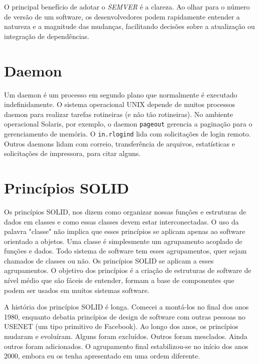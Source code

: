\documentclass[12pt, %
openright, 
oneside, %
a4paper,    %
brazil]{facom-ufu-abntex2}
\begin{document}
O principal benefício de adotar o \textit{SEMVER} é a clareza. Ao olhar para o
número de versão de um software, os desenvolvedores podem rapidamente entender
a natureza e a magnitude das mudanças, facilitando decisões sobre a atualização
ou integração de dependências. \cite{semver}

\section{Daemon}

Um daemon é um processo em segundo plano que normalmente é executado
indefinidamente. O sistema operacional UNIX depende de muitos processos daemon
para realizar tarefas rotineiras (e não tão rotineiras). No ambiente
operacional Solaris, por exemplo, o daemon \texttt{pageout} gerencia a
paginação para o gerenciamento de memória. O \texttt{in.rlogind} lida com
solicitações de login remoto. Outros daemons lidam com correio, transferência
de arquivos, estatísticas e solicitações de impressora, para citar alguns.
\cite{kay2004unix}

\section{Princípios SOLID}

Os princípios SOLID, nos dizem como organizar nossas funções e estruturas de
dados em classes e como essas classes devem estar interconectadas. O uso da
palavra "classe" não implica que esses princípios se aplicam apenas ao software
orientado a objetos. Uma classe é simplesmente um agrupamento acoplado de
funções e dados. Todo sistema de software tem esses agrupamentos, quer sejam
chamados de classes ou não. Os princípios SOLID se aplicam a esses
agrupamentos. O objetivo dos princípios é a criação de estruturas de software
de nível médio que são fáceis de entender, formam a base de componentes que
podem ser usados em muitos sistemas software.

A história dos princípios SOLID é longa. Comecei a montá-los no final dos anos
1980, enquanto debatia princípios de design de software com outras pessoas no
USENET (um tipo primitivo de Facebook). Ao longo dos anos, os princípios
mudaram e evoluíram. Alguns foram excluídos. Outros foram mesclados. Ainda
outros foram adicionados. O agrupamento final estabilizou-se no início dos anos
2000, embora eu os tenha apresentado em uma ordem diferente.
\end{document}
